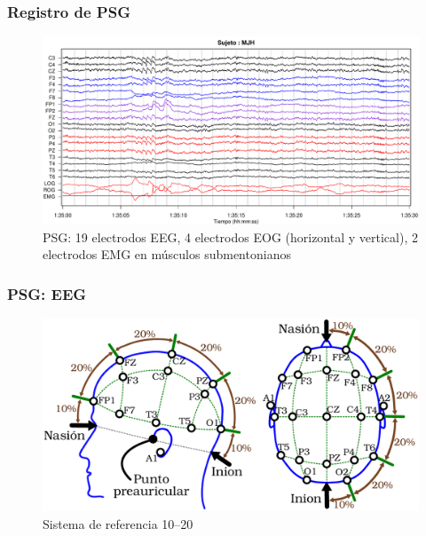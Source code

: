 \documentclass{beamer}
\begin{document}

\begin{frame}\frametitle{Registro de PSG}
\begin{figure}
\centering
\includegraphics[width=0.9\linewidth]{./p_170427/MJH_190_PDG_lucirse_PSG.pdf}
\caption{PSG: 19 electrodos EEG, 4 electrodos EOG (horizontal y vertical), 2 electrodos EMG en 
m\'usculos submentonianos}
\end{figure}
\end{frame}


\begin{frame}\frametitle{PSG: EEG}
\begin{figure}
\centering
\includegraphics[width=0.9\linewidth]{cabeza_hecha.pdf} 
\caption{Sistema de referencia 10--20}
\end{figure}
\end{frame}
\end{document}
